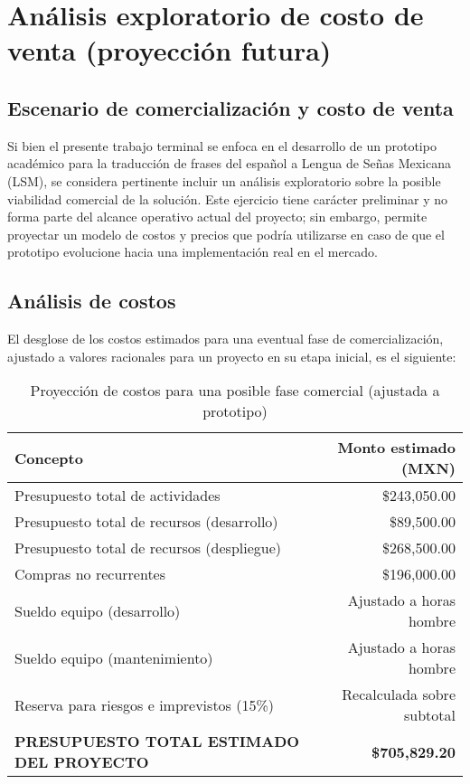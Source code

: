 \newpage

\section{Análisis exploratorio de costo de venta (proyección futura)}

\subsection{Escenario de comercialización y costo de venta}

Si bien el presente trabajo terminal se enfoca en el desarrollo de un prototipo académico para la traducción de frases del español a Lengua de Señas Mexicana (LSM), se considera pertinente incluir un análisis exploratorio sobre la posible viabilidad comercial de la solución. Este ejercicio tiene carácter preliminar y no forma parte del alcance operativo actual del proyecto; sin embargo, permite proyectar un modelo de costos y precios que podría utilizarse en caso de que el prototipo evolucione hacia una implementación real en el mercado.

\subsection{Análisis de costos}

El desglose de los costos estimados para una eventual fase de comercialización, ajustado a valores racionales para un proyecto en su etapa inicial, es el siguiente:

\begin{table}[h!]
	\centering
	\renewcommand{\arraystretch}{1.5}
	\setlength{\tabcolsep}{12pt}
	\begin{tabular}{|l|r|}
		\hline
		\textbf{Concepto}                                  & \textbf{Monto estimado (MXN)} \\ \hline
		Presupuesto total de actividades                  & \$243,050.00                  \\ \hline
		Presupuesto total de recursos (desarrollo)        & \$89,500.00                   \\ \hline
		Presupuesto total de recursos (despliegue)        & \$268,500.00                  \\ \hline
		Compras no recurrentes                            & \$196,000.00                  \\ \hline
		Sueldo equipo (desarrollo)                        & Ajustado a horas hombre       \\ \hline
		Sueldo equipo (mantenimiento)                     & Ajustado a horas hombre       \\ \hline
		Reserva para riesgos e imprevistos (15\%)         & Recalculada sobre subtotal    \\ \hline
		\textbf{PRESUPUESTO TOTAL ESTIMADO DEL PROYECTO} & \textbf{\$705,829.20}         \\ \hline
	\end{tabular}
	\caption{Proyección de costos para una posible fase comercial (ajustada a prototipo)}
	\label{tab:costos_venta}
\end{table}

